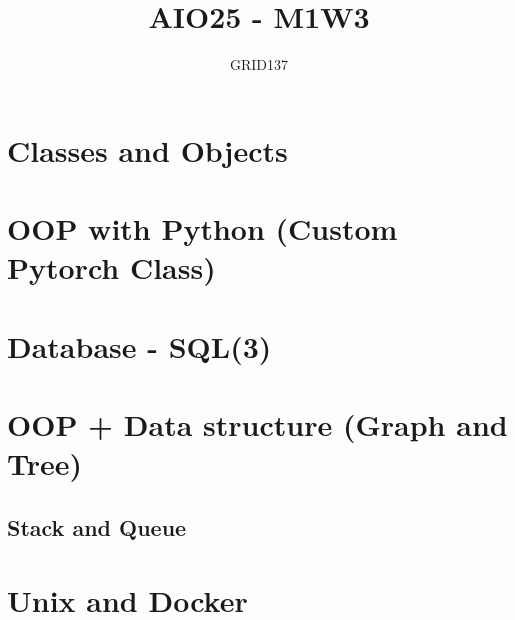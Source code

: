 \documentclass[12pt]{report}
\title{AIO25 - M1W3}
\author{GRID137}
\begin{document}
	
	\maketitle
	\tableofcontents
	\listoffigures
	\listoftables
	
	\chapter{Classes and Objects}
	
	
	\chapter{OOP with Python (Custom Pytorch Class)}
	
	\chapter{Database - SQL(3)}
	
	\chapter{OOP + Data structure (Graph and Tree)}
	\section{Stack and Queue}
	
	
	\chapter{Unix and Docker}
	
\end{document}
